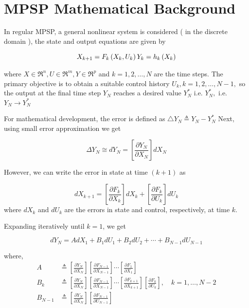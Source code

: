\documentclass[12pt]{article}
\begin{document}
\section{MPSP Mathematical Background}

In regular MPSP, a general nonlinear system is considered ( in the discrete domain ), the state and output equations are given by

\begin{equation}
X_{k+1}=F_{k}\left(X_{k}, U_{k}\right) \\
Y_{k}=h_{k}\left(X_{k}\right)
\end{equation}

where $X \in \Re^{n}, U \in \Re^{m}, Y \in \Re^{p}$ and $k=1,2, \ldots, N$ are the time steps. The primary objective is to obtain a suitable control history $U_{k}, k=1,2, \ldots, N-1,$ so the output at the final time step $Y_{N}$ reaches a desired value $Y_{N}^{*}$ i.e. $Y_{N}^{*},$ i.e. $Y_{N} \rightarrow Y_{N}^{*}$

For mathematical development, the error is defined as $  \triangle Y_{N} \triangleq Y_{N}-Y_{N}^{*} $ Next, using small error approximation we get

\begin{equation}
\Delta Y_{N} \cong d Y_{N}=\left[\frac{\partial Y_{N}}{\partial X_{N}}\right] d X_{N}
\end{equation}

However, we can write the error in state at time $ (k+1)$ as

\begin{equation}
d X_{k+1}=\left[\frac{\partial F_{k}}{\partial X_{k}}\right] d X_{k}+\left[\frac{\partial F_{k}}{\partial U_{k}}\right] d U_{k}
\end{equation}
where $d X_{k}$ and $d U_{k}$ are the errors in state and control, respectively, at time $k$.

Expanding iteratively until $k=1$, we get

\begin{equation}
d Y_{N}=A d X_{1}+B_{1} d U_{1}+B_{2} d U_{2}+\cdots+B_{N-1} d U_{N-1}
\label{eq:dYEquation}
\end{equation}

where,
\begin{equation}\begin{aligned}
A & \triangleq\left[\frac{\partial Y_{N}}{\partial X_{N}}\right]\left[\frac{\partial F_{N-1}}{\partial X_{N-1}}\right] \cdots\left[\frac{\partial F_{1}}{\partial X_{1}}\right] \\
B_{k} & \triangleq\left[\frac{\partial Y_{N}}{\partial X_{N}}\right]\left[\frac{\partial F_{N-1}}{\partial X_{N-1}}\right] \cdots\left[\frac{\partial F_{k+1}}{\partial X_{k+1}}\right]\left[\frac{\partial F_{k}}{\partial U_{k}}\right], \quad k=1, \ldots, N-2 \\
B_{N-1} & \triangleq \left[\frac{\partial Y_{N}}{\partial X_{N}}\right]\left[\frac{\partial F_{N-1}}{\partial U_{N-1}}\right]
\end{aligned}\end{equation}
\end{document}
